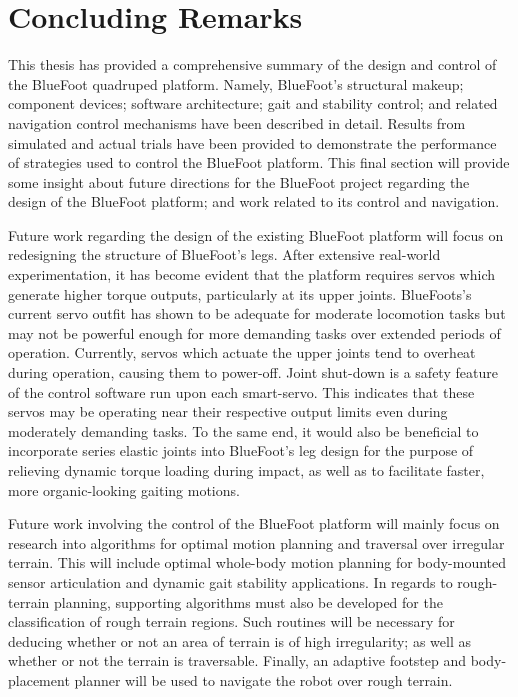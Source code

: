 \chapter{Concluding Remarks}
	\label{ch::conclusion}


	This thesis has provided a comprehensive summary of the design and control of the BlueFoot quadruped platform. Namely, BlueFoot's structural makeup; component devices; software architecture; gait and stability control; and related navigation control mechanisms have been described in detail. Results from simulated and actual trials have been provided to demonstrate the performance of strategies used to control the BlueFoot platform. This final section will provide some insight about future directions for the BlueFoot project regarding the design of the BlueFoot platform; and work related to its control and navigation.


	Future work regarding the design of the existing BlueFoot platform will focus on redesigning the structure of BlueFoot's legs. After extensive real-world experimentation, it has become evident that the platform requires servos which generate higher torque outputs, particularly at its upper joints. BlueFoots's current servo outfit has shown to be adequate for moderate locomotion tasks but may not be powerful enough for more demanding tasks over extended periods of operation. Currently, servos which actuate the upper joints tend to overheat during operation, causing them to power-off. Joint shut-down is a safety feature of the control software run upon each smart-servo. This indicates that these servos may be operating near their respective output limits even during moderately demanding tasks. To the same end, it would also be beneficial to incorporate series elastic joints into  BlueFoot's leg design for the purpose of relieving dynamic torque loading during impact, as well as to facilitate faster, more organic-looking gaiting motions.


	Future work involving the control of the BlueFoot platform will mainly focus on research into algorithms for optimal motion planning and traversal over irregular terrain. This will include optimal whole-body motion planning for body-mounted sensor articulation and dynamic gait stability applications. In regards to rough-terrain planning, supporting algorithms must also be developed for the classification of rough terrain regions. Such routines will be necessary for deducing whether or not an area of terrain is of high irregularity; as well as whether or not the terrain is traversable. Finally, an adaptive footstep and body-placement planner will be used to navigate the robot over rough terrain. 


